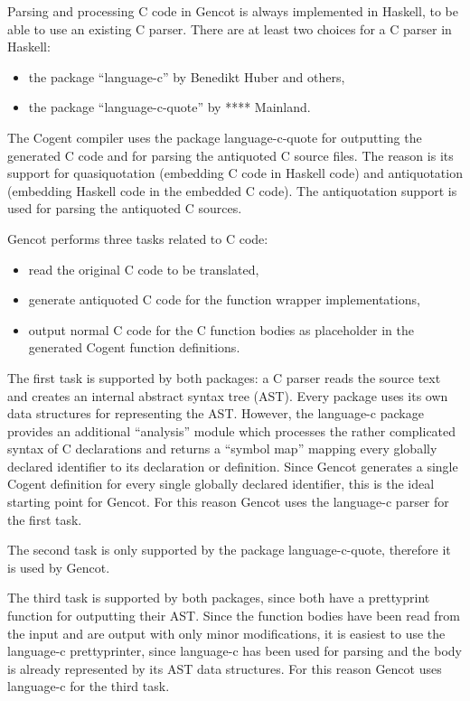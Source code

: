 
Parsing and processing C code in Gencot is always implemented in Haskell, to be able to use an existing
C parser. There are at least two choices for a C parser in Haskell:
\begin{itemize}
\item the package ``language-c'' by Benedikt Huber and others,
\item the package ``language-c-quote'' by **** Mainland.
\end{itemize}

The Cogent compiler uses the package language-c-quote for outputting the generated C code and for parsing the antiquoted
C source files. The reason is its support for quasiquotation (embedding C code in Haskell code) and antiquotation
(embedding Haskell code in the embedded C code). The antiquotation support is used for parsing the antiquoted C sources.

Gencot performs three tasks related to C code:
\begin{itemize}
\item read the original C code to be translated,
\item generate antiquoted C code for the function wrapper implementations,
\item output normal C code for the C function bodies as placeholder in the generated Cogent function definitions.
\end{itemize}

The first task is supported by both packages: a C parser reads the source text and creates an internal abstract syntax tree (AST).
Every package uses its own data structures for representing the AST. However, the language-c package provides an additional
``analysis'' module which processes the rather complicated syntax of C declarations and returns a ``symbol map'' mapping
every globally declared identifier to its declaration or definition. Since Gencot generates a single Cogent definition for
every single globally declared identifier, this is the ideal starting point for Gencot. For this reason Gencot uses
the language-c parser for the first task.

The second task is only supported by the package language-c-quote, therefore it is used by Gencot. 

The third task is supported by both packages, since both have a prettyprint function for outputting their AST. Since the 
function bodies have been read from the input and are output with only minor modifications, it is easiest to use
the language-c prettyprinter, since language-c has been used for parsing and the body is already represented by its 
AST data structures. For this reason Gencot uses language-c for the third task.

